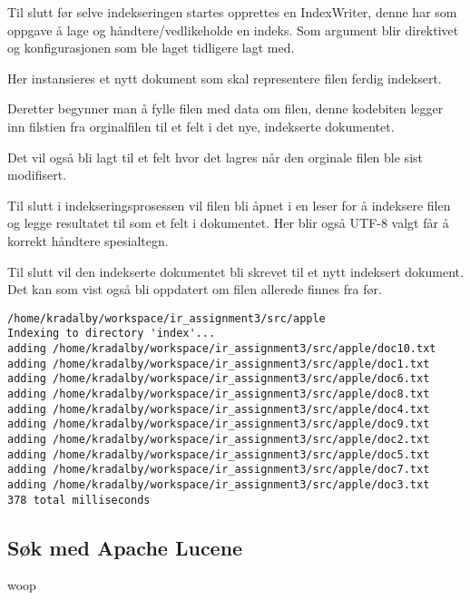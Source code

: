 
Til slutt før selve indekseringen startes opprettes en IndexWriter, denne har som oppgave å lage og håndtere/vedlikeholde en indeks. Som argument blir direktivet og konfigurasjonen som ble laget tidligere lagt med.


Her instansieres et nytt dokument som skal representere filen ferdig indeksert.


Deretter begynner man å fylle filen med data om filen, denne kodebiten legger inn filstien fra orginalfilen til et felt i det nye, indekserte dokumentet. 


Det vil også bli lagt til et felt hvor det lagres når den orginale filen ble sist modifisert.


Til slutt i indekseringsprosessen vil filen bli åpnet i en leser for å indeksere filen og legge resultatet til som et felt i dokumentet. Her blir også UTF-8 valgt får å korrekt håndtere spesialtegn.

Til slutt vil den indekserte dokumentet bli skrevet til et nytt indeksert dokument. Det kan som vist også bli oppdatert om filen allerede finnes fra før.




\begin{lstlisting}[frame=single]  % Start your code-block
/home/kradalby/workspace/ir_assignment3/src/apple
Indexing to directory 'index'...
adding /home/kradalby/workspace/ir_assignment3/src/apple/doc10.txt
adding /home/kradalby/workspace/ir_assignment3/src/apple/doc1.txt
adding /home/kradalby/workspace/ir_assignment3/src/apple/doc6.txt
adding /home/kradalby/workspace/ir_assignment3/src/apple/doc8.txt
adding /home/kradalby/workspace/ir_assignment3/src/apple/doc4.txt
adding /home/kradalby/workspace/ir_assignment3/src/apple/doc9.txt
adding /home/kradalby/workspace/ir_assignment3/src/apple/doc2.txt
adding /home/kradalby/workspace/ir_assignment3/src/apple/doc5.txt
adding /home/kradalby/workspace/ir_assignment3/src/apple/doc7.txt
adding /home/kradalby/workspace/ir_assignment3/src/apple/doc3.txt
378 total milliseconds
\end{lstlisting}

\subsection*{Søk med Apache Lucene}
woop
